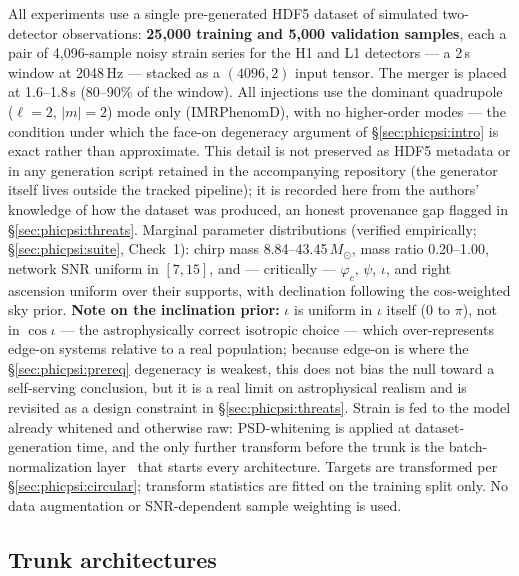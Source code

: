 \documentclass[11pt]{article}
\begin{document}
All experiments use a single pre-generated HDF5 dataset of simulated two-detector observations: \textbf{25{,}000 training and 5{,}000 validation samples}, each a pair of 4{,}096-sample noisy strain series for the H1 and L1 detectors --- a 2\,s window at 2048\,Hz --- stacked as a $(4096, 2)$ input tensor.
The merger is placed at 1.6--1.8\,s (80--90\% of the window).
All injections use the dominant quadrupole ($\ell=2$, $|m|=2$) mode only (IMRPhenomD), with no higher-order modes --- the condition under which the face-on degeneracy argument of \S\ref{sec:phicpsi:intro} is exact rather than approximate.
This detail is not preserved as HDF5 metadata or in any generation script retained in the accompanying repository (the generator itself lives outside the tracked pipeline); it is recorded here from the authors' knowledge of how the dataset was produced, an honest provenance gap flagged in \S\ref{sec:phicpsi:threats}.
Marginal parameter distributions (verified empirically; \S\ref{sec:phicpsi:suite}, Check~1): chirp mass 8.84--43.45\,$M_\odot$, mass ratio 0.20--1.00, network SNR uniform in $[7, 15]$, and --- critically --- $\varphi_c$, $\psi$, $\iota$, and right ascension uniform over their supports, with declination following the cos-weighted sky prior.
\textbf{Note on the inclination prior:} $\iota$ is uniform in $\iota$ itself ($0$ to $\pi$), not in $\cos\iota$ --- the astrophysically correct isotropic choice --- which over-represents edge-on systems relative to a real population; because edge-on is where the \S\ref{sec:phicpsi:prereq} degeneracy is weakest, this does not bias the null toward a self-serving conclusion, but it is a real limit on astrophysical realism and is revisited as a design constraint in \S\ref{sec:phicpsi:threats}.
Strain is fed to the model already whitened and otherwise raw: PSD-whitening is applied at dataset-generation time, and the only further transform before the trunk is the batch-normalization layer~\citep{ioffe2015batchnorm} that starts every architecture.
Targets are transformed per \S\ref{sec:phicpsi:circular}; transform statistics are fitted on the training split only.
No data augmentation or SNR-dependent sample weighting is used.

\subsection{Trunk architectures}
\label{sec:phicpsi:trunks}
\end{document}
